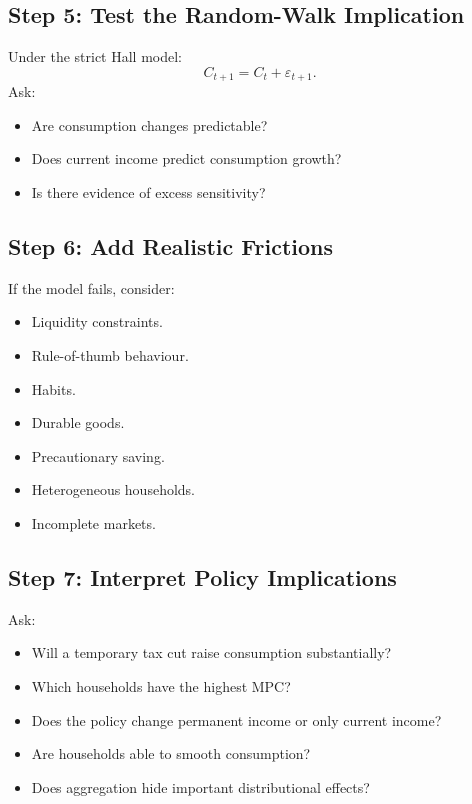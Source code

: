 \documentclass[12pt,a4paper]{article}
\begin{document}
\subsection*{Step 5: Test the Random-Walk Implication}
Under the strict Hall model:
\[ C_{t+1} = C_t + \varepsilon_{t+1}. \]
Ask:
\begin{itemize}
    \item Are consumption changes predictable?
    \item Does current income predict consumption growth?
    \item Is there evidence of excess sensitivity?
\end{itemize}

\subsection*{Step 6: Add Realistic Frictions}
If the model fails, consider:
\begin{itemize}
    \item Liquidity constraints.
    \item Rule-of-thumb behaviour.
    \item Habits.
    \item Durable goods.
    \item Precautionary saving.
    \item Heterogeneous households.
    \item Incomplete markets.
\end{itemize}

\subsection*{Step 7: Interpret Policy Implications}
Ask:
\begin{itemize}
    \item Will a temporary tax cut raise consumption substantially?
    \item Which households have the highest MPC?
    \item Does the policy change permanent income or only current income?
    \item Are households able to smooth consumption?
    \item Does aggregation hide important distributional effects?
\end{itemize}
\end{document}
